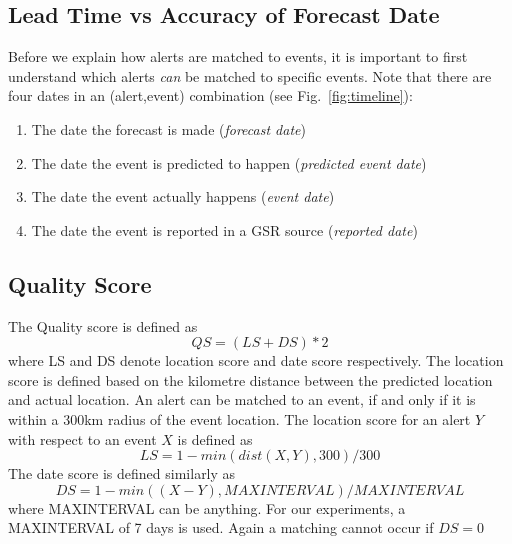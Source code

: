 \subsection{Lead Time vs Accuracy of Forecast Date}
Before we explain how alerts are matched to events, it is important to
first understand which alerts {\it can} be matched to specific events.
Note that there are four dates in an (alert,event) combination (see Fig.~\ref{fig:timeline}):
\begin{enumerate}
\item The date the forecast is made ({\it forecast date})
\item The date the event is predicted to happen ({\it predicted event date})
\item The date the event actually happens ({\it event date})
\item The date the event is reported in a GSR source ({\it reported date})
\end{enumerate}

\subsection{Quality Score}
The Quality score is defined as $$QS = (LS + DS)*2$$ where LS and DS denote location score and date score respectively. The location score is defined based on the kilometre distance between the predicted location and actual location. An alert can be matched to an event, if and only if it is within a 300km radius of the event location. The location score for an alert $Y$ with respect to an event $X$ is defined as $$LS=1 - min(dist(X,Y), 300) / 300 $$
The date score is defined similarly as $$DS = 1 - min( (X-Y), MAXINTERVAL)/MAXINTERVAL$$ where MAXINTERVAL  can be anything. For our experiments, a MAXINTERVAL of 7 days is used. Again a matching cannot occur if $DS=0$
